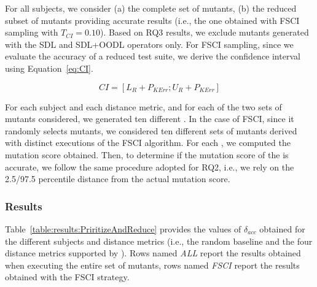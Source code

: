For all subjects, we consider (a) the complete set of mutants, (b) the reduced subset of mutants providing accurate results (i.e., the one obtained with FSCI sampling with $T_{\mathit{CI}}=0.10$).
Based on RQ3 results, we exclude mutants generated with the SDL and SDL+OODL operators only.
For FSCI sampling, since we evaluate the accuracy of a reduced test suite, we derive the confidence interval using Equation~\ref{eq:CI}.

\begin{equation}
\label{eq:CI}
\mathit{CI}=[\mathit{L}_{R}+P_\mathit{KErr};\mathit{U}_{R}+P_{\mathit{KErr}}]
\end{equation}



For each subject and each distance metric, and for each of the two sets of mutants considered, we generated ten different \MPTSs. In the case of FSCI, since it randomly selects mutants, we considered ten different sets of mutants derived with distinct executions of the FSCI algorithm. For each \MPTS, we computed the mutation score obtained.
Then, to determine if the mutation score of the \MPTS is accurate, we follow the same procedure adopted for RQ2, i.e., we rely on the 2.5/97.5 percentile distance from the actual mutation score.



\subsubsection{Results}




Table~\ref{table:results:PriritizeAndReduce} provides the values of $\delta_{acc}$ obtained for the different subjects and distance metrics (i.e., the random baseline and the four distance metrics supported by \APPR). Rows named \emph{ALL} report the results obtained when executing the entire set of mutants, rows named \emph{FSCI}  report the results obtained  with the FSCI strategy.



